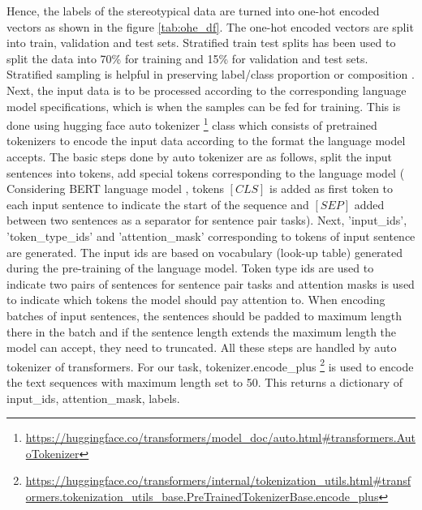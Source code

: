 Hence, the labels of the stereotypical data are turned into one-hot encoded vectors as shown in the figure \ref{tab:ohe_df}. The one-hot encoded vectors are split into train, validation and test sets. Stratified train test splits  has been used to split the data into 70\% for training and 15\% for validation and test sets. Stratified sampling is helpful in preserving label/class proportion or composition \cite{merrillees2021stratified}. Next, the input data is to be processed according to the corresponding language model specifications, which is when the samples can be fed for training. This is done using hugging face auto tokenizer \footnote{\url{https://huggingface.co/transformers/model_doc/auto.html#transformers.AutoTokenizer}} class which consists of pretrained tokenizers to encode the input data according to the format the language model accepts. The basic steps done by auto tokenizer are as follows, split the input sentences into tokens, add special tokens corresponding to the language model ( Considering BERT language model \cite{devlin2018bert}, tokens $[CLS]$ is  added as first token to each input sentence to indicate the start of the sequence and $[SEP]$ added between two sentences as a separator for sentence pair tasks). Next, 'input\_ids', 'token\_type\_ids' and 'attention\_mask' corresponding to tokens of input sentence are generated. The input ids are based on vocabulary (look-up table) generated during the pre-training of the language model. Token type ids are used to indicate two pairs of sentences for sentence pair tasks and attention masks is used to indicate which tokens the model should pay attention to. When encoding batches of input sentences, the sentences should be padded to maximum length there in the batch and if the sentence length extends the maximum length the model can accept, they need to truncated. All these steps are handled by auto tokenizer of transformers. For our task, tokenizer.encode\_plus \footnote{\url{https://huggingface.co/transformers/internal/tokenization_utils.html#transformers.tokenization_utils_base.PreTrainedTokenizerBase.encode_plus}} is used to encode the text sequences with maximum length set to 50. This returns a dictionary of input\_ids, attention\_mask, labels. 

